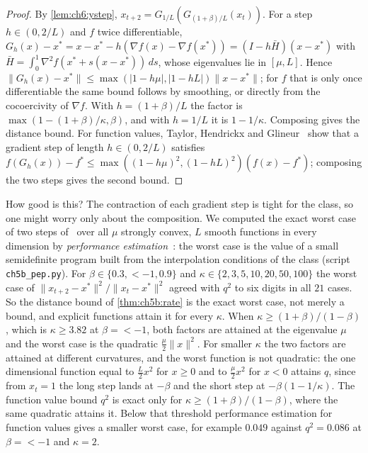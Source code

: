 \begin{proof}
By \cref{lem:ch6:ystep}, $x_{t+2}=G_{1/L}(G_{(1+\beta)/L}(x_t))$. For a step
$h\in(0,2/L)$ and $f$ twice differentiable,
$G_h(x)-x^*=x-x^*-h(\nabla f(x)-\nabla f(x^*))=(I-h\bar H)(x-x^*)$ with
$\bar H=\int_0^1\nabla^2f(x^*+s(x-x^*))\,ds$, whose eigenvalues lie in
$[\mu,L]$. Hence $\|G_h(x)-x^*\|\le\max(|1-h\mu|,|1-hL|)\|x-x^*\|$; for $f$ that
is only once differentiable the same bound follows by smoothing, or directly
from the cocoercivity of $\nabla f$. With $h=(1+\beta)/L$ the factor is
$\max(1-(1+\beta)/\kappa,\beta)$, and with $h=1/L$ it is $1-1/\kappa$. Composing
gives the distance bound.
For function values, Taylor, Hendrickx and Glineur~\cite[Theorem~3.3]{taylor2018} show that a gradient step of length $h\in(0,2/L)$ satisfies $f(G_h(x))-f^*\le\max((1-h\mu)^2,(1-hL)^2)(f(x)-f^*)$; composing the two steps gives the second bound.
\end{proof}

How good is this? The contraction of each gradient step is tight for the class,
so one might worry only about the composition. We computed the exact worst case
of two steps of \smmdet\ over all $\mu$ strongly convex, $L$ smooth functions in
every dimension by \emph{performance estimation}~\cite{drori2014,taylor2017}: the
worst case is the value of a small semidefinite program built from the
interpolation conditions of the class (script \texttt{ch5b\_pep.py}). For
$\beta\in\{0.3,\lt-1,0.9\}$ and $\kappa\in\{2,3,5,10,20,50,100\}$ the worst case
of $\|x_{t+2}-x^*\|^2/\|x_t-x^*\|^2$ agreed with $q^2$ to six digits in all $21$
cases.
So the distance bound of \cref{thm:ch5b:rate} is the exact worst case, not merely a bound, and explicit functions attain it for every $\kappa$. When $\kappa\ge(1+\beta)/(1-\beta)$, which is $\kappa\ge3.82$ at $\beta=\lt-1$, both factors are attained at the eigenvalue $\mu$ and the worst case is the quadratic $\frac\mu2\|x\|^2$. For smaller $\kappa$ the two factors are attained at different curvatures, and the worst function is not quadratic: the one dimensional function equal to $\frac L2x^2$ for $x\ge0$ and to $\frac\mu2x^2$ for $x<0$ attains $q$, since from $x_t=1$ the long step lands at $-\beta$ and the short step at $-\beta(1-1/\kappa)$.
The function value bound $q^2$ is exact only for $\kappa\ge(1+\beta)/(1-\beta)$, where the same quadratic attains it. Below that threshold performance estimation for function values gives a smaller worst case, for example $0.049$ against $q^2=0.086$ at $\beta=\lt-1$ and $\kappa=2$.

